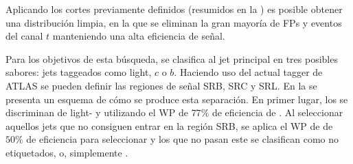 Aplicando los cortes previamente definidos (resumidos en la \Tab{\ref{fig:evt_selection:sr:signal_regions_scheme}}) es posible obtener una distribución \myj limpia, en la que se eliminan la gran mayoría de \acp{FP} y eventos del canal \(t\) manteniendo una alta eficiencia de señal.

Para los objetivos de esta búsqueda, se clasifica al jet principal en tres posibles sabores: jets taggeados como light, \(c\) o \(b\). Haciendo uso del actual tagger de \ac{ATLAS} se pueden definir las regiones de señal SRB, SRC y SRL. En la \Fig{\ref{fig:evt_selection:sr:signal_regions_scheme}} se presenta un esquema de cómo se produce esta separación. En primer lugar, los \bjets se discriminan de light- y \cjets utilizando el \ac{WP} de \(77\%\) de eficiencia de \btagging. Al seleccionar aquellos jets que no consiguen entrar en la región SRB, se aplica el \ac{WP} de \ctagging de \(50\%\) de eficiencia para seleccionar \cjets y los que no pasan este \ctagger se clasifican como no etiquetados, o, simplemente \ljets.

